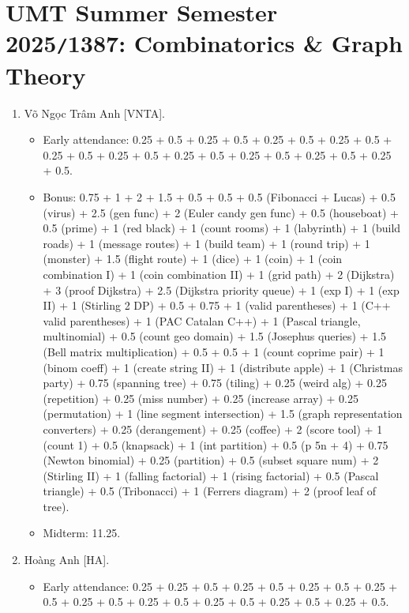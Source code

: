 \documentclass{article}
\begin{document}

\section{UMT Summer Semester 2025{\tt/}1387: Combinatorics \& Graph Theory}

\begin{enumerate}
	\item {\sc Võ Ngọc Trâm Anh [VNTA].}
	\begin{itemize}
		\item Early attendance: 0.25 + 0.5 + 0.25 + 0.5 + 0.25 + 0.5 + 0.25 + 0.5 + 0.25 + 0.5 + 0.25 + 0.5 + 0.25 + 0.5 + 0.25 + 0.5 + 0.25 + 0.5 + 0.25 + 0.5.
		\item Bonus: 0.75 + 1 + 2 + 1.5 + 0.5 + 0.5 + 0.5 (Fibonacci + Lucas) + 0.5 (virus) + 2.5 (gen func) + 2 (Euler candy gen func) + 0.5 (houseboat) + 0.5 (prime) + 1 (red black) + 1 (count rooms) + 1 (labyrinth) + 1 (build roads) + 1 (message routes) + 1 (build team) + 1 (round trip) + 1 (monster) + 1.5 (flight route) + 1 (dice) + 1 (coin) + 1 (coin combination I) + 1 (coin combination II) + 1 (grid path) + 2 (Dijkstra) + 3 (proof Dijkstra) + 2.5 (Dijkstra priority queue) + 1 (exp I) + 1 (exp II) + 1 (Stirling 2 DP) + 0.5 + 0.75 + 1 (valid parentheses) + 1 (C++ valid parentheses) + 1 (PAC Catalan C++) + 1 (Pascal triangle, multinomial) + 0.5 (count geo domain) + 1.5 (Josephus queries) + 1.5 (Bell matrix multiplication) + 0.5 + 0.5 + 1 (count coprime pair) + 1 (binom coeff) + 1 (create string II) + 1 (distribute apple) + 1 (Christmas party) + 0.75 (spanning tree) + 0.75 (tiling) + 0.25 (weird alg) + 0.25 (repetition) + 0.25 (miss number) + 0.25 (increase array) + 0.25 (permutation) + 1 (line segment intersection) + 1.5 (graph representation converters) + 0.25 (derangement) + 0.25 (coffee) + 2 (score tool) + 1 (count 1) + 0.5 (knapsack) + 1 (int partition) + 0.5 (p 5n + 4) + 0.75 (Newton binomial) + 0.25 (partition) + 0.5 (subset square num) + 2 (Stirling II) + 1 (falling factorial) + 1 (rising factorial) + 0.5 (Pascal triangle) + 0.5 (Tribonacci) + 1 (Ferrers diagram) + 2 (proof leaf of tree).
        \item Midterm: 11.25.
	\end{itemize}
	\item {\sc Hoàng Anh [HA].}
	\begin{itemize}
		\item Early attendance: 0.25 + 0.25 + 0.5 + 0.25 + 0.5 + 0.25 + 0.5 + 0.25 + 0.5 + 0.25 + 0.5 + 0.25 + 0.5 + 0.25 + 0.5 + 0.25 + 0.5 + 0.25 + 0.5.

\end{itemize}
\end{enumerate}
\end{document}
